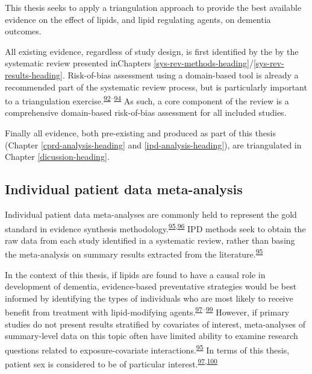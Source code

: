 \documentclass[a4paper, twoside]{templates/ociamthesis}
\begin{document}
This thesis seeks to apply a triangulation approach to provide the best available evidence on the effect of lipids, and lipid regulating agents, on dementia outcomes.

All existing evidence, regardless of study design, is first identified by the by the systematic review presented inChapters \ref{sys-rev-methods-heading}/\ref{sys-rev-results-heading}. Risk-of-bias assessment using a domain-based tool is already a recommended part of the systematic review process, but is particularly important to a triangulation exercise.\textsuperscript{\protect\hyperlink{ref-page2021}{92}--\protect\hyperlink{ref-mcguinness2018}{94}} As such, a core component of the review is a comprehensive domain-based risk-of-bias assessment for all included studies.

Finally all evidence, both pre-existing and produced as part of this thesis (Chapter \ref{cprd-analysis-heading} and \ref{ipd-analysis-heading}), are triangulated in Chapter \ref{dicussion-heading}.

\hypertarget{individual-patient-data-meta-analysis}{%
\subsection{Individual patient data meta-analysis}\label{individual-patient-data-meta-analysis}}

Individual patient data meta-analyses are commonly held to represent the gold standard in evidence synthesis methodology.\textsuperscript{\protect\hyperlink{ref-riley2010}{95},\protect\hyperlink{ref-stewart1993}{96}} IPD methods seek to obtain the raw data from each study identified in a systematic review, rather than basing the meta-analysis on summary results extracted from the literature.\textsuperscript{\protect\hyperlink{ref-riley2010}{95}}

In the context of this thesis, if lipids are found to have a causal role in development of dementia, evidence-based preventative strategies would be best informed by identifying the types of individuals who are most likely to receive benefit from treatment with lipid-modifying agents.\textsuperscript{\protect\hyperlink{ref-arain2009}{97}--\protect\hyperlink{ref-mccartney2016}{99}} However, if primary studies do not present results stratified by covariates of interest, meta-analyses of summary-level data on this topic often have limited ability to examine research questions related to exposure-covariate interactions.\textsuperscript{\protect\hyperlink{ref-riley2010}{95}} In terms of this thesis, patient sex is considered to be of particular interest.\textsuperscript{\protect\hyperlink{ref-arain2009}{97},\protect\hyperlink{ref-letenneur1999}{100}}
\end{document}
